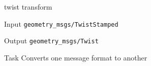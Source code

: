 \begin{frame}{twist transform}
	\begin{alertblock}{Input}
	\texttt{geometry\_msgs/TwistStamped}
    \end{alertblock}
    
    \begin{alertblock}{Output}
	\texttt{geometry\_msgs/Twist}
    \end{alertblock}
    
    \begin{alertblock}{Task}
   Converts one message format to another
    \end{alertblock}
\end{frame}

